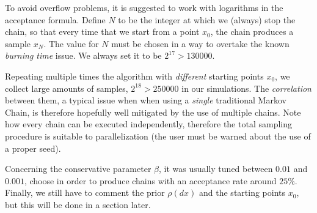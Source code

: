 \documentclass[8pt]{article}
\begin{document}
To avoid overflow problems, it is suggested to work with
logarithms in the acceptance formula. Define
$N$ to be the integer at which we (always) stop the chain,
so that every time that we start from a point $x_0$,
the chain produces a sample
$x_N$. The value for $N$ must
be chosen in a way to overtake the known \emph{burning time} issue.
We always set it to be $2^{17} > 130000$.


Repeating multiple times the algorithm with \emph{different} starting points
$x_0$,
we collect large amounts of samples, $2^{18} > 250000$ in our simulations.
The \emph{correlation} between them, a typical issue when
when using a \emph{single} traditional Markov Chain,
is therefore hopefully well mitigated by the use of multiple chains.
Note how every chain can be executed independently,
therefore the total sampling procedure 
is suitable to parallelization
(the user must be warned about the use of a proper seed).


Concerning the conservative parameter $\beta$, it was usually tuned between
$0.01$ and $0.001$, choose in order to produce chains with
an acceptance rate around $25\%$.
Finally, we still have to comment the prior $\rho(dx)$ and
the starting points $x_0$, but this will be done in a section later.

\end{document}
